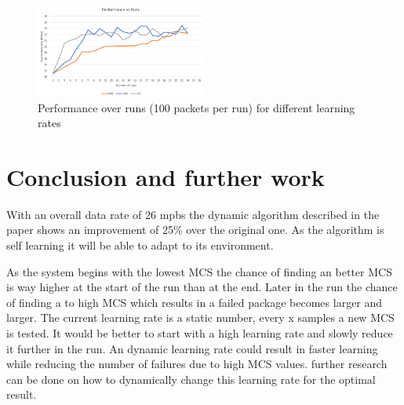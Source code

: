 \documentclass[conference,compsoc]{IEEEtran}
\begin{document}
\begin{figure}[h!]
    \centering
    \includegraphics[width=0.5\textwidth]{img/PerformanceVSruns.PNG} 
    \caption{Performance over runs (100 packets per run) for different learning rates}
    \label{fig:linegraph}
\end{figure}


\section{Conclusion and further work}
With an overall data rate of 26 mpbs the dynamic algorithm described in the paper shows an improvement of 25\% over the original one. As the algorithm is self learning it will be able to adapt to its environment.  

As the system begins with the lowest MCS the chance of finding an better MCS is way higher at the start of the run than at the end. Later in the run the chance of finding a to high MCS which results in a failed package becomes larger and larger. The current learning rate is a static number, every x samples a new MCS is tested. It would be better to start with a high learning rate and slowly reduce it further in the run. An dynamic learning rate could result in faster learning while reducing the number of failures due to high MCS values. further research can be done on how to dynamically change this learning rate for the optimal result. 






\end{document}
